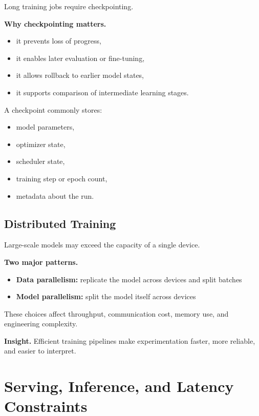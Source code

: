 Long training jobs require checkpointing.

\medskip

\noindent
\textbf{Why checkpointing matters.}
\begin{itemize}
    \item it prevents loss of progress,
    \item it enables later evaluation or fine-tuning,
    \item it allows rollback to earlier model states,
    \item it supports comparison of intermediate learning stages.
\end{itemize}

\medskip

\noindent
A checkpoint commonly stores:
\begin{itemize}
    \item model parameters,
    \item optimizer state,
    \item scheduler state,
    \item training step or epoch count,
    \item metadata about the run.
\end{itemize}

\subsection{Distributed Training}

Large-scale models may exceed the capacity of a single device.

\medskip

\noindent
\textbf{Two major patterns.}
\begin{itemize}
    \item \textbf{Data parallelism:} replicate the model across devices and split batches
    \item \textbf{Model parallelism:} split the model itself across devices
\end{itemize}

\medskip

\noindent
These choices affect throughput, communication cost, memory use, and engineering complexity.

\medskip

\noindent
\textbf{Insight.}
Efficient training pipelines make experimentation faster, more reliable, and easier to interpret.

\section{Serving, Inference, and Latency Constraints}

